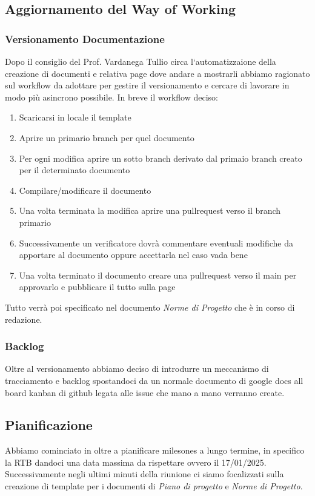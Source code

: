 \subsection{Aggiornamento del Way of Working}
\subsubsection{Versionamento Documentazione}
Dopo il consiglio del Prof. Vardanega Tullio circa l`automatizzaione della creazione di documenti e relativa page dove andare a mostrarli abbiamo ragionato 
sul workflow da adottare per gestire il versionamento e cercare di lavorare in modo più asincrono possibile.
In breve il workflow deciso:
\begin{enumerate}
    \item Scaricarsi in locale il template
    \item Aprire un primario branch per quel documento
    \item Per ogni modifica aprire un sotto branch derivato dal primaio branch creato per il determinato documento
    \item Compilare/modificare il documento
    \item Una volta terminata la modifica aprire una pullrequest verso il branch primario
    \item Successivamente un verificatore dovrà commentare eventuali modifiche da apportare al documento oppure accettarla nel caso vada bene
    \item Una volta terminato il documento creare una pullrequest verso il main per approvarlo e pubblicare il tutto sulla page
\end{enumerate}
Tutto verrà poi specificato nel documento \textit{Norme di Progetto} che è in corso di redazione.
\subsubsection{Backlog}
Oltre al versionamento abbiamo deciso di introdurre un meccanismo di tracciamento e backlog spostandoci da un normale documento di google docs all board kanban di github legata
alle issue che mano a mano verranno create.


\subsection{Pianificazione}
Abbiamo cominciato in oltre a pianificare milesones a lungo termine, in specifico la RTB dandoci una data massima da rispettare ovvero il 17/01/2025. Successivamente negli ultimi minuti della riunione
ci siamo focalizzati sulla creazione di template per i documenti di \textit{Piano di progetto} e \textit{Norme di Progetto}.

